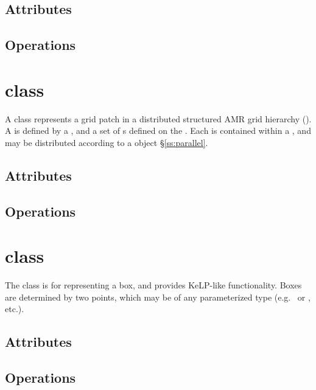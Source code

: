 \documentclass{book}
\begin{document}
\subsection{Attributes}

\subsection{Operations}

\section{ class}

A  class represents a grid patch in a distributed structured
AMR grid hierarchy ().  A  is defined by a
, and a set of s defined on the .  Each
 is contained within a , and may be distributed
according to a  object \S\ref{ss:parallel}.

\subsection{Attributes}

\subsection{Operations}

\section{ class}

The  class is for representing a box, and provides KeLP-like functionality.
Boxes are determined by two points, which may be of any parameterized type
(e.g.~ or , etc.).


\subsection{Attributes}

\subsection{Operations}
\end{document}
